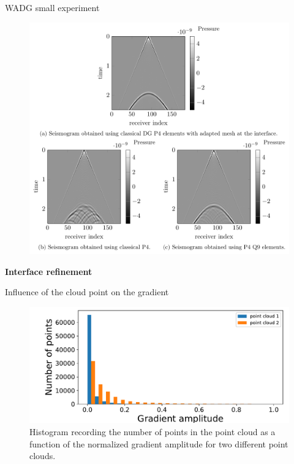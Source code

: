 \begin{frame}[noframenumbering]{WADG small experiment}
\vspace{-0.3cm}
\begin{figure}[htbp]
\includegraphics[scale=0.25]{image/flemme_wadg.png}
\end{figure}


\end{frame}








\begin{frame}[noframenumbering]

\Large{\textbf{Interface refinement}}

\end{frame}


\begin{frame}[noframenumbering]{Influence of the cloud point on the gradient}
\begin{figure}[H]
\centering
\includegraphics[scale=0.5]{image/histo_comparison_grad.pdf}
\caption{Histogram recording the number of points in the
point cloud as a function of the normalized gradient amplitude for two different point clouds.}
\label{histo_comparison_grad}
\end{figure}
\end{frame}



